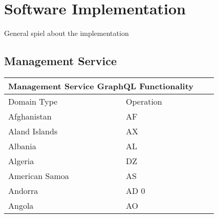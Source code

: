 \chapter{Software Implementation}
General spiel about the implementation

\section{Management Service}

\begin{tabular}{ |p{3cm}||p{3cm}|p{3cm}|p{3cm}|  }
	\hline
	\multicolumn{2}{|c|}{Management Service GraphQL Functionality}\\
	\hline
	Domain Type& Operation \\
	\hline
	Afghanistan   & AF   \\
	Aland Islands&   AX  \\
	Albania &AL \\
	Algeria    &DZ\\
	American Samoa&   AS  \\
	Andorra& AD  0\\
	Angola& AO \\
	\hline
\end{tabular}